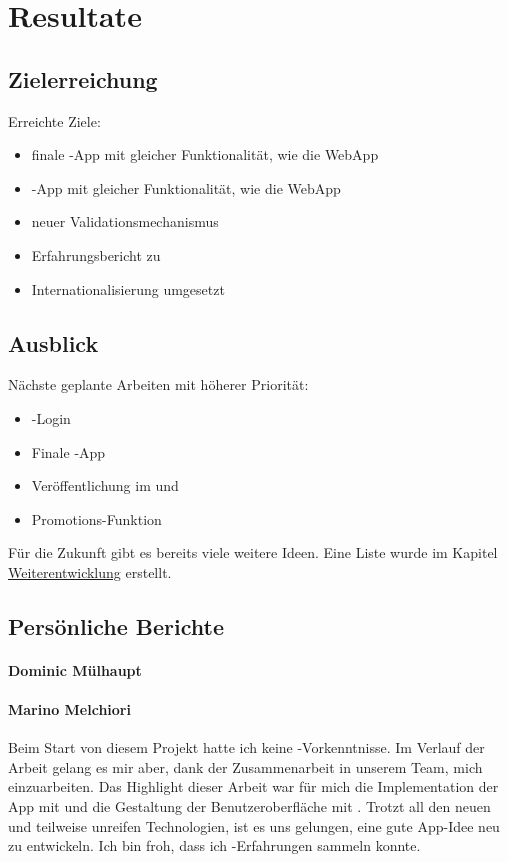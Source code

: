 \chapter{Resultate}
\label{tb-resultate}




\section{Zielerreichung}
Erreichte Ziele:

\begin{itemize}
	\item finale -App mit gleicher Funktionalität, wie die \gls{WebApp}
	\item {}-App mit gleicher Funktionalität, wie die \gls{WebApp}
	\item neuer Validationsmechanismus
	\item Erfahrungsbericht zu 
	\item Internationalisierung umgesetzt
\end{itemize}

\section{Ausblick}
Nächste geplante Arbeiten mit höherer Priorität:

\begin{itemize}
	\item {}-Login
	\item Finale -App
	\item Veröffentlichung im  und  
	\item Promotions-Funktion
\end{itemize}

Für die Zukunft gibt es bereits viele weitere Ideen. 
Eine Liste wurde im Kapitel \hyperref[pd-resultate-weiterentwicklung]{Weiterentwicklung} erstellt.

\section{Persönliche Berichte}

\subsubsection{Dominic Mülhaupt}

\subsubsection{Marino Melchiori}
Beim Start von diesem Projekt hatte ich keine -Vorkenntnisse.
Im Verlauf der Arbeit gelang es mir aber, dank der Zusammenarbeit in unserem Team, mich einzuarbeiten.
Das Highlight dieser Arbeit war für mich die Implementation der App mit  und die Gestaltung der Benutzeroberfläche mit .
Trotzt all den neuen und teilweise unreifen Technologien, ist es uns gelungen, eine gute App-Idee neu zu entwickeln.
Ich bin froh, dass ich -Erfahrungen sammeln konnte.